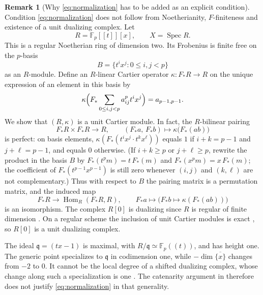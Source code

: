 \documentclass[11pt]{amsart}
\newcommand{\F}{\mathbb{F}}
\newcommand{\Hom}{\operatorname{Hom}}
\theoremstyle{plain}
\theoremstyle{definition}
\newtheorem{remark}[remark]{Remark}
\numberwithin{equation}{section}
\begin{document}
\begin{remark}[Why \eqref{eq:normalization} has to be added as an explicit condition]\label{rem:middle-counterexample}
Condition \eqref{eq:normalization} does not follow from Noetherianity, $F$-finiteness and existence of a unit dualizing complex.
Let
\[
 R=\F_p[[t]][x],\qquad X=\operatorname{Spec}R.
\]
This is a regular Noetherian ring of dimension two.
Its Frobenius is finite free on the $p$-basis
\[
 B=\{t^ix^j:0\leq i,j<p\}
\]
as an $R$-module.
Define an $R$-linear Cartier operator $\kappa:F_*R\to R$ on the unique expression of an element in this basis by
\[
 \kappa\Bigl(F_*\sum_{0\leq i,j<p}a_{ij}^{p}t^ix^j\Bigr)=a_{p-1,p-1}.
\]
We show that $(R,\kappa)$ is a unit Cartier module. In fact, the $R$-bilinear pairing
\[
 F_*R\times F_*R\to R,\qquad
 (F_*a,\,F_*b)\mapsto\kappa\bigl(F_*(ab)\bigr)
\]
is perfect: on basis elements, $\kappa(F_*(t^ix^j\cdot t^kx^\ell))$ equals $1$ if $i+k=p-1$ and $j+\ell=p-1$, and equals $0$ otherwise.
(If $i+k\geq p$ or $j+\ell\geq p$, rewrite the product in the basis $B$ by $F_*(t^p m)=t\,F_*(m)$ and $F_*(x^p m)=x\,F_*(m)$; the coefficient of $F_*(t^{p-1}x^{p-1})$ is still zero whenever $(i,j)$ and $(k,\ell)$ are not complementary.)
Thus with respect to $B$ the pairing matrix is a permutation matrix, and the induced map
\[
 F_*R\to\Hom_R(F_*R,R),\qquad
 F_*a\mapsto\bigl(F_*b\mapsto\kappa(F_*(ab))\bigr)
\]
is an isomorphism.
The complex $R[0]$ is dualizing since $R$ is regular of finite dimension \cite[\href{https://stacks.math.columbia.edu/tag/0AWX}{Tag 0AWX}]{SP}.
On a regular scheme the inclusion of unit Cartier modules is exact \cite[Lemma 3.4.11]{Bau}, so $R[0]$ is a unit dualizing complex.

The ideal $\mathfrak q=(tx-1)$ is maximal, with $R/\mathfrak q\simeq\F_p((t))$, and has height one.
The generic point specializes to $\mathfrak q$ in codimension one, while $-\dim\overline{\{x\}}$ changes from $-2$ to $0$.
It cannot be the local degree of a shifted dualizing complex, whose change along such a specialization is one \cite[\href{https://stacks.math.columbia.edu/tag/0AWF}{Tag 0AWF}]{SP}.
The catenarity argument in \cite[proof of Lemma 5.2.2]{Bau} therefore does not justify \eqref{eq:normalization} in that generality.
\end{remark}
\end{document}
